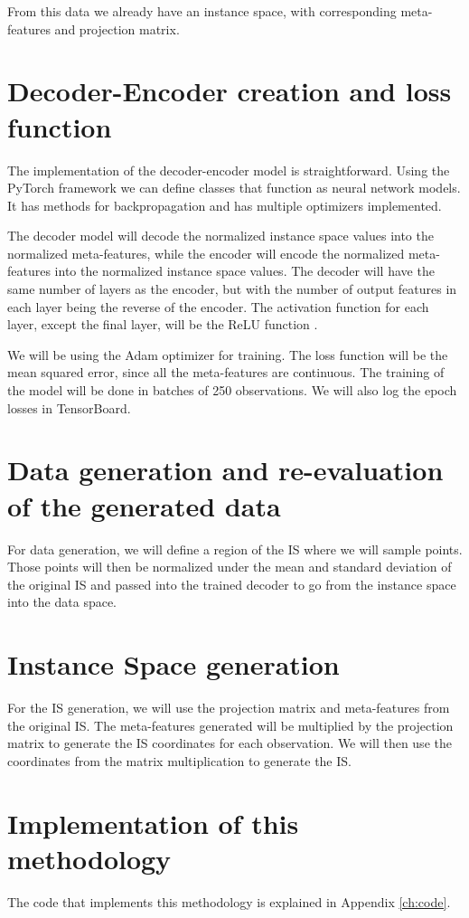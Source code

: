 From this data we already have an instance space, with corresponding meta-features and projection matrix.


\section{Decoder-Encoder creation and loss function}

The implementation of the decoder-encoder model is straightforward. Using the PyTorch \cite{paszke2019pytorch} framework we can define classes that function as neural network models. It has methods for backpropagation and has multiple optimizers implemented. 

The decoder model will decode the normalized instance space values into the normalized meta-features, while the encoder will encode the normalized meta-features into the normalized instance space values. The decoder will have the same number of layers as the encoder, but with the number of output features in each layer being the reverse of the encoder. The activation function for each layer, except the final layer, will be the ReLU function \cite{agarap2019deep}.

We will be using the Adam optimizer \cite{kingma2017adam} for training. The loss function will be the mean squared error, since all the meta-features are continuous. The training of the model will be done in batches of 250 observations. We will also log the epoch losses in TensorBoard.

\section{Data generation and re-evaluation of the generated data}

For data generation, we will define a region of the IS where we will sample points. Those points will then be normalized under the mean and standard deviation of the original IS and passed into the trained decoder to go from the instance space into the data space.

\section{Instance Space generation}

For the IS generation, we will use the projection matrix and meta-features from the original IS. The meta-features generated will be multiplied by the projection matrix to generate the IS coordinates for each observation. We will then use the coordinates from the matrix multiplication to generate the IS.

\section{Implementation of this methodology}

The code that implements this methodology is explained in Appendix \ref{ch:code}.